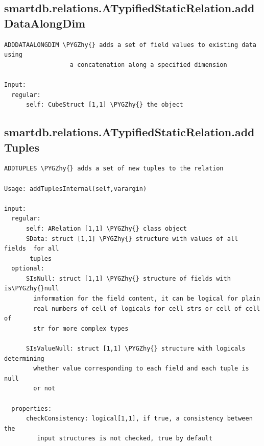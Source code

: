\documentclass[letterpaper,10pt,english]{sphinxmanual}
\def\PYGZhy{\char`\-}
\begin{document}
\subsection{smartdb.relations.ATypifiedStaticRelation.addDataAlongDim}
\label{chap_functions:smartdb-relations-atypifiedstaticrelation-adddataalongdim}
\begin{Verbatim}[commandchars=\\\{\}]
ADDDATAALONGDIM \PYGZhy{} adds a set of field values to existing data using
                  a concatenation along a specified dimension

Input:
  regular:
      self: CubeStruct [1,1] \PYGZhy{} the object
\end{Verbatim}


\subsection{smartdb.relations.ATypifiedStaticRelation.addTuples}
\label{chap_functions:smartdb-relations-atypifiedstaticrelation-addtuples}
\begin{Verbatim}[commandchars=\\\{\}]
ADDTUPLES \PYGZhy{} adds a set of new tuples to the relation

Usage: addTuplesInternal(self,varargin)

input:
  regular:
      self: ARelation [1,1] \PYGZhy{} class object
      SData: struct [1,1] \PYGZhy{} structure with values of all fields  for all
       tuples
  optional:
      SIsNull: struct [1,1] \PYGZhy{} structure of fields with is\PYGZhy{}null
        information for the field content, it can be logical for plain
        real numbers of cell of logicals for cell strs or cell of cell of
        str for more complex types

      SIsValueNull: struct [1,1] \PYGZhy{} structure with logicals determining
        whether value corresponding to each field and each tuple is null
        or not

  properties:
      checkConsistency: logical[1,1], if true, a consistency between the
         input structures is not checked, true by default
\end{Verbatim}
\end{document}
